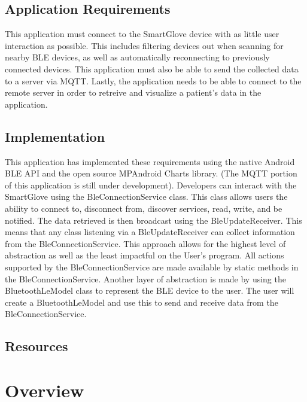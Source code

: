 \documentclass{scrreprt}
\begin{document}
\section{Application Requirements}
This application must connect to the SmartGlove device with as little user interaction
as possible. This includes filtering devices out when scanning for nearby BLE devices,
as well as automatically reconnecting to previously connected devices. This application
must also be able to send the collected data to a server via MQTT. Lastly, the application
needs to be able to connect to the remote server in order to retreive and visualize 
a patient's data in the application.

\section{Implementation}
This application has implemented these requirements using the native Android BLE API
and the open source MPAndroid Charts library. (The MQTT portion of this application
is still under development). Developers can interact with the SmartGlove using the 
BleConnectionService class. This class allows users the ability to connect to,
disconnect from, discover services, read, write, and be notified. The data retrieved
is then broadcast using the BleUpdateReceiver. This means that any class listening 
via a BleUpdateReceiver can collect information from the BleConnectionService. 
This approach allows for the highest level of abstraction as well as the least impactful
on the User's program. All actions supported by the BleConnectionService are made 
available by static methods in the BleConnectionService. Another layer of abstraction
is made by using the BluetoothLeModel class to represent the BLE device to the user.
The user will create a BluetoothLeModel and use this to send and receive data from the
BleConnectionService.

\section{Resources}



\chapter{Overview}
\end{document}
